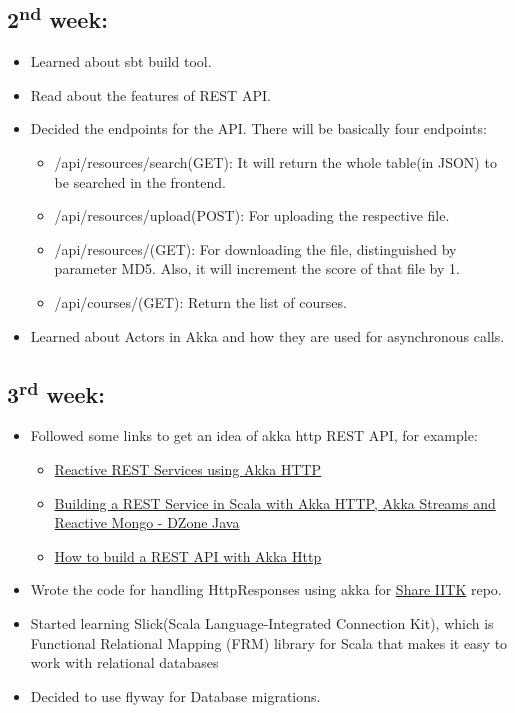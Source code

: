 \documentclass{article}
\begin{document}
\subsection*{2\textsuperscript{nd} week:}
\begin{itemize}
    \item Learned about sbt build tool.
    \item Read about the features of REST API.
    \item Decided the endpoints for the API. There will be basically four endpoints:
        \begin{itemize}
            \item /api/resources/search(GET): It will return the whole table(in JSON) to be searched in the frontend.
            \item /api/resources/upload(POST): For uploading the respective file.
            \item /api/resources/(GET): For downloading the file, distinguished by parameter MD5. Also, it will increment the score of that file by 1.
            \item /api/courses/(GET): Return the list of courses.
        \end{itemize}
    \item Learned about Actors in Akka and how they are used for asynchronous calls.
    \end{itemize}
    
    
\subsection*{3\textsuperscript{rd} week:}
\begin{itemize}
    \item Followed some links to get an idea of akka http REST API, for example:
        \begin{itemize}
            \item \href{https://spindance.com/reactive-rest-services-akka-http/}{Reactive REST Services using Akka HTTP}
            \item \href{https://dzone.com/articles/building-rest-service-scala}{Building a REST Service in Scala with Akka HTTP, Akka Streams and Reactive Mongo - DZone Java}
            \item \href{https://danielasfregola.com/2016/02/07/how-to-build-a-rest-api-with-akka-http/}{How to build a REST API with Akka Http}
    \end{itemize}
    \item Wrote the code for handling HttpResponses using akka for \href{https://github.com/abhayptp/share-iitk}{Share IITK} repo.
    \item Started learning Slick(Scala Language-Integrated Connection Kit), which is Functional Relational Mapping (FRM) library for Scala that makes it easy to work with relational databases
    \item Decided to use flyway for Database migrations.
\end{itemize}
\end{document}
